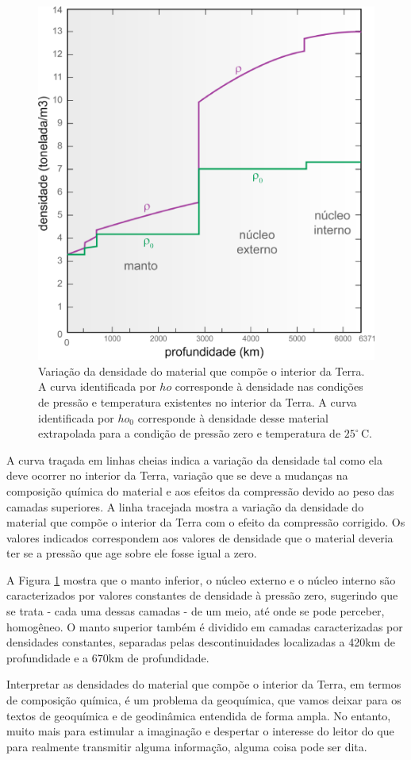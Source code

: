 \documentclass[]{book}
\theoremstyle{definition}
\theoremstyle{definition}
\theoremstyle{definition}
\theoremstyle{remark}
\begin{document}
\begin{figure}

{\centering \includegraphics[width=0.5\linewidth]{fig/figU20} 

}

\caption{Variação da densidade do material que compõe o interior da Terra. A curva identificada por $
ho$ corresponde à densidade nas condições de pressão e temperatura existentes no interior da Terra. A curva identificada por $
ho_0$ corresponde à densidade desse material extrapolada para a condição de pressão zero e temperatura de $25^\circ\, \mathrm{C}$.}\label{fig:usp0420}
\end{figure}

A curva traçada em linhas cheias indica a variação da densidade tal como ela deve ocorrer no interior da Terra, variação que se deve a mudanças na composição química do material e aos efeitos da compressão devido ao peso das camadas superiores. A linha tracejada mostra a variação da densidade do material que compõe o interior da Terra com o efeito da compressão corrigido. Os valores indicados correspondem aos valores de densidade que o material deveria ter se a pressão que age sobre ele fosse igual a zero.

A Figura \ref{fig:usp0420} mostra que o manto inferior, o núcleo externo e o núcleo interno são caracterizados por valores constantes de densidade à pressão zero, sugerindo que se trata - cada uma dessas camadas - de um meio, até onde se pode perceber, homogêneo. O manto superior também é dividido em camadas caracterizadas por densidades constantes, separadas pelas descontinuidades localizadas a 420km de profundidade e a 670km de profundidade.

Interpretar as densidades do material que compõe o interior da Terra, em termos de composição química, é um problema da geoquímica, que vamos deixar para os textos de geoquímica e de geodinâmica entendida de forma ampla. No entanto, muito mais para estimular a imaginação e despertar o interesse do leitor do que para realmente transmitir alguma informação, alguma coisa pode ser dita.
\end{document}
